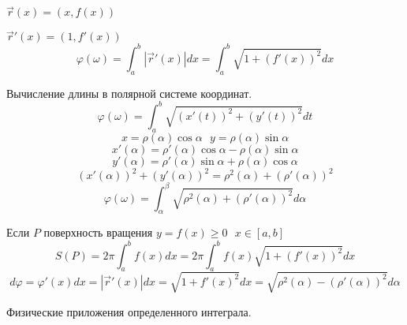 $\vec r(x) = (x, f(x))$

$\vec r'(x) = (1, f'(x))$
$$
\varphi(\omega) = \int_a^b |\vec r'(x)|dx = \int_a^b \sqrt{1 + (f'(x))^2}dx
$$

  Вычисление длины в полярной системе координат.
$$
\varphi (\omega) = \int_a^b \sqrt{(x'(t))^2 + (y'(t))^2}dt
$$
$$
x = \rho (\alpha) \cos \alpha ~~~ y = \rho (\alpha) \sin \alpha
$$
$$
x'(\alpha) = \rho'(\alpha) \cos \alpha - \rho(\alpha) \sin \alpha
$$
$$
y'(\alpha) = \rho'(\alpha) \sin \alpha + \rho(\alpha) \cos \alpha
$$
$$
(x'(\alpha))^2 + (y'(\alpha))^2 = \rho^2(\alpha) + (\rho'(\alpha))^2
$$
$$
\varphi (\omega) = \int_{\alpha}^{\beta}
\sqrt{\rho^2 (\alpha) + (\rho'(\alpha))^2} d\alpha
$$

  Если $P$ поверхность вращения $y=f(x) \ge 0 ~~~ x \in [a,b]$
$$
S(P) = 2\pi \int_a^b f(x)dx = 2\pi \int_a^b f(x) \sqrt{1 + (f'(x))^2} dx
$$
$$
d\varphi = \varphi' (x)dx = |\vec r'(x)|dx = \sqrt{1+f'(x)^2}dx =
\sqrt{\rho^2 (\alpha) - (\rho'(\alpha))^2} d\alpha
$$

\begin{title}[\Large]
  Физические приложения определенного интеграла.
\end{title}

